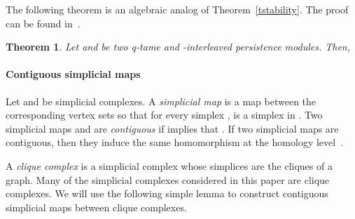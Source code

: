 \documentclass[a4paper]{article}
\newtheorem{theorem}{Theorem}[section]
\begin{document}
\begin{center}
\end{center}

The following theorem is an algebraic analog of Theorem~\ref{tstability}.
The proof can be found in~\cite{sspmCDGO}.

\begin{theorem}\label{tModStability}
Let  and  be two q-tame and -interleaved persistence modules. 
Then,

\end{theorem}

\paragraph{Contiguous simplicial maps\\}
Let  and  be simplicial complexes.
A \emph{simplicial map}  is a map between the corresponding vertex sets so that for every simplex ,  is a simplex in .
Two simplicial maps  and  are \emph{contiguous} if  implies that .
 If two simplicial maps are contiguous, then they induce the same homomorphism at the homology level~\cite[Chapter 1]{munkres84elements}.

A \emph{clique complex} is a simplicial complex whose simplices are the cliques of a graph.
Many of the simplicial complexes considered in this paper are clique complexes.
We will use the following simple lemma to construct contiguous simplicial maps between clique complexes.
\end{document}
